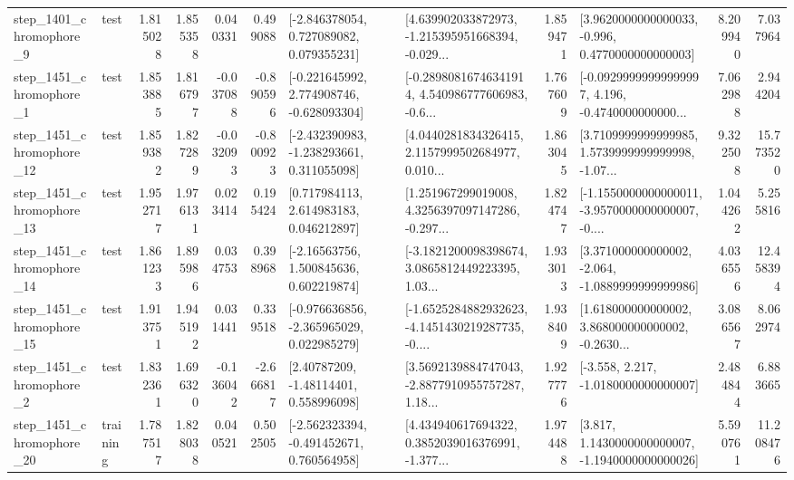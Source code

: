 \begin{tabular}{llrrrrllrlrr}
  step\_1401\_chromophore\_9 &      test &      1.815028 &    1.855358 &      0.040331 &  0.499088 &    [-2.846378054, 0.727089082, 0.079355231] &  [4.639902033872973, -1.215395951668394, -0.029... &       1.859471 &   [3.9620000000000033, -0.996, 0.4770000000000003] &            8.209940 &          7.037964 \\
  step\_1451\_chromophore\_1 &      test &      1.853885 &    1.816797 &     -0.037088 & -0.890596 &   [-0.221645992, 2.774908746, -0.628093304] &  [-0.28980816746341914, 4.540986777606983, -0.6... &       1.767609 &  [-0.09299999999999997, 4.196, -0.4740000000000... &            7.062988 &          2.944204 \\
 step\_1451\_chromophore\_12 &      test &      1.859382 &    1.827289 &     -0.032093 & -0.800923 &   [-2.432390983, -1.238293661, 0.311055098] &  [4.0440281834326415, 2.1157999502684977, 0.010... &       1.863045 &  [3.7109999999999985, 1.5739999999999998, -1.07... &            9.322508 &         15.773520 \\
 step\_1451\_chromophore\_13 &      test &      1.952717 &    1.976131 &      0.023414 &  0.195424 &     [0.717984113, 2.614983183, 0.046212897] &  [1.251967299019008, 4.3256397097147286, -0.297... &       1.824747 &  [-1.1550000000000011, -3.9570000000000007, -0.... &            1.044262 &          5.255816 \\
 step\_1451\_chromophore\_14 &      test &      1.861233 &    1.895986 &      0.034753 &  0.398968 &     [-2.16563756, 1.500845636, 0.602219874] &  [-3.1821200098398674, 3.0865812449223395, 1.03... &       1.933013 &   [3.371000000000002, -2.064, -1.0889999999999986] &            4.036556 &         12.458394 \\
 step\_1451\_chromophore\_15 &      test &      1.913751 &    1.945192 &      0.031441 &  0.339518 &   [-0.976636856, -2.365965029, 0.022985279] &  [-1.6525284882932623, -4.1451430219287735, -0.... &       1.938409 &  [1.618000000000002, 3.868000000000002, -0.2630... &            3.086567 &          8.062974 \\
  step\_1451\_chromophore\_2 &      test &      1.832361 &    1.696320 &     -0.136042 & -2.666817 &      [2.40787209, -1.48114401, 0.558996098] &  [3.5692139884747043, -2.8877910955757287, 1.18... &       1.927776 &               [-3.558, 2.217, -1.0180000000000007] &            2.484844 &          6.883665 \\
 step\_1451\_chromophore\_20 &  training &      1.787517 &    1.828038 &      0.040521 &  0.502505 &   [-2.562323394, -0.491452671, 0.760564958] &  [4.434940617694322, 0.3852039016376991, -1.377... &       1.974488 &   [3.817, 1.1430000000000007, -1.1940000000000026] &            5.590761 &         11.208476 \\

\end{tabular}
